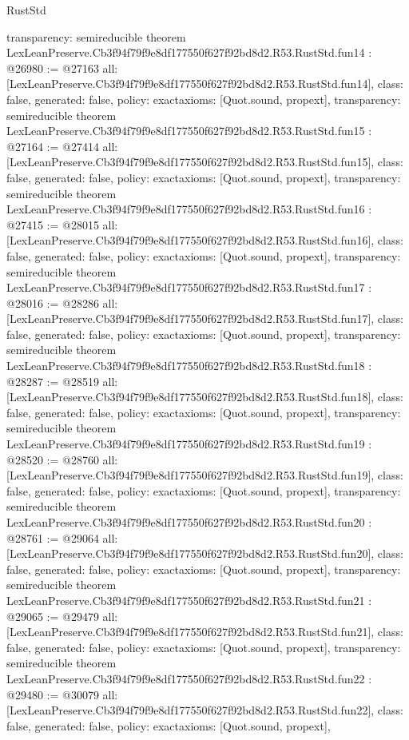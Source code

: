 \begin{lexlean}{RustStd}
\begin{coremodule}
{  transparency: semireducible
}
theorem LexLeanPreserve.Cb3f94f79f9e8df177550f627f92bd8d2.R53.RustStd.fun14 : @26980 := @27163 {
  all: [LexLeanPreserve.Cb3f94f79f9e8df177550f627f92bd8d2.R53.RustStd.fun14],
  class: false,
  generated: false,
  policy: exact{axioms: [Quot.sound, propext]},
  transparency: semireducible
}
theorem LexLeanPreserve.Cb3f94f79f9e8df177550f627f92bd8d2.R53.RustStd.fun15 : @27164 := @27414 {
  all: [LexLeanPreserve.Cb3f94f79f9e8df177550f627f92bd8d2.R53.RustStd.fun15],
  class: false,
  generated: false,
  policy: exact{axioms: [Quot.sound, propext]},
  transparency: semireducible
}
theorem LexLeanPreserve.Cb3f94f79f9e8df177550f627f92bd8d2.R53.RustStd.fun16 : @27415 := @28015 {
  all: [LexLeanPreserve.Cb3f94f79f9e8df177550f627f92bd8d2.R53.RustStd.fun16],
  class: false,
  generated: false,
  policy: exact{axioms: [Quot.sound, propext]},
  transparency: semireducible
}
theorem LexLeanPreserve.Cb3f94f79f9e8df177550f627f92bd8d2.R53.RustStd.fun17 : @28016 := @28286 {
  all: [LexLeanPreserve.Cb3f94f79f9e8df177550f627f92bd8d2.R53.RustStd.fun17],
  class: false,
  generated: false,
  policy: exact{axioms: [Quot.sound, propext]},
  transparency: semireducible
}
theorem LexLeanPreserve.Cb3f94f79f9e8df177550f627f92bd8d2.R53.RustStd.fun18 : @28287 := @28519 {
  all: [LexLeanPreserve.Cb3f94f79f9e8df177550f627f92bd8d2.R53.RustStd.fun18],
  class: false,
  generated: false,
  policy: exact{axioms: [Quot.sound, propext]},
  transparency: semireducible
}
theorem LexLeanPreserve.Cb3f94f79f9e8df177550f627f92bd8d2.R53.RustStd.fun19 : @28520 := @28760 {
  all: [LexLeanPreserve.Cb3f94f79f9e8df177550f627f92bd8d2.R53.RustStd.fun19],
  class: false,
  generated: false,
  policy: exact{axioms: [Quot.sound, propext]},
  transparency: semireducible
}
theorem LexLeanPreserve.Cb3f94f79f9e8df177550f627f92bd8d2.R53.RustStd.fun20 : @28761 := @29064 {
  all: [LexLeanPreserve.Cb3f94f79f9e8df177550f627f92bd8d2.R53.RustStd.fun20],
  class: false,
  generated: false,
  policy: exact{axioms: [Quot.sound, propext]},
  transparency: semireducible
}
theorem LexLeanPreserve.Cb3f94f79f9e8df177550f627f92bd8d2.R53.RustStd.fun21 : @29065 := @29479 {
  all: [LexLeanPreserve.Cb3f94f79f9e8df177550f627f92bd8d2.R53.RustStd.fun21],
  class: false,
  generated: false,
  policy: exact{axioms: [Quot.sound, propext]},
  transparency: semireducible
}
theorem LexLeanPreserve.Cb3f94f79f9e8df177550f627f92bd8d2.R53.RustStd.fun22 : @29480 := @30079 {
  all: [LexLeanPreserve.Cb3f94f79f9e8df177550f627f92bd8d2.R53.RustStd.fun22],
  class: false,
  generated: false,
  policy: exact{axioms: [Quot.sound, propext]},
}
\end{coremodule}
\end{lexlean}
